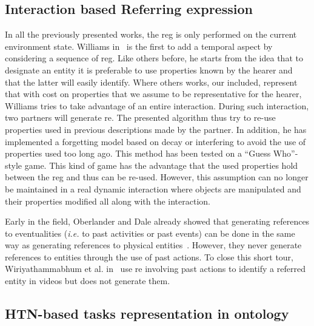 \subsection{Interaction based Referring expression}

In all the previously presented works, the \acrshort{reg} is only performed on the current environment state. Williams in~\cite{williams_2020_toward} is the first to add a temporal aspect by considering a sequence of \acrshort{reg}. Like others before, he starts from the idea that to designate an entity it is preferable to use properties known by the hearer and that the latter will easily identify. Where others works, our included, represent that with cost on properties that we assume to be representative for the hearer, Williams tries to take advantage of an entire interaction. During such interaction, two partners will generate \acrshort{re}. The presented algorithm thus try to re-use properties used in previous descriptions made by the partner. In addition, he has implemented a forgetting model based on decay or interfering to avoid the use of properties used too long ago. This method has been tested on a ``Guess Who''-style game. This kind of game has the advantage that the used properties hold between the \acrshort{reg} and thus can be re-used. However, this assumption can no longer be maintained in a real dynamic interaction where objects are manipulated and their properties modified all along with the interaction.

Early in the field, Oberlander and Dale already showed that generating references to eventualities (\textit{i.e.} to past activities or past events) can be done in the same way as generating references to physical entities~\cite{oberlander_1991_generating}. However, they never generate references to entities through the use of past actions. To close this short tour, Wiriyathammabhum et al. in~\cite{wiriyathammabhum_2019_referring} use \acrshort{re} involving past actions to identify a referred entity in videos but does not generate them.


\subsection{HTN-based tasks representation in ontology}

